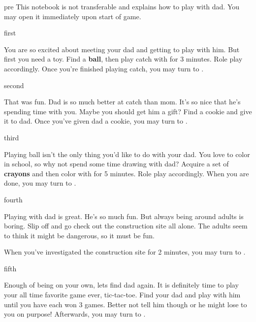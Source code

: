\documentclass[notebook]{guildcamp1}
\begin{document}
\startnotebook{\nPlayWithDad{}}

\begin{page}{pre}
This notebook is not transferable and explains how to play with dad. You may open it immediately upon start of game.
\end{page}

\begin{page}{first}

You are so excited about meeting your dad and getting to play with him. But first you need a toy. Find a {\bf ball}, then play catch with \cGroomA{} for 3 minutes. Role play accordingly.  Once you're finished playing catch, you may turn to .

\end{page}

\begin{page}{second}

That was fun. Dad is so much better at catch than mom. It's so nice that he's spending time with you. Maybe you should get him a gift? Find a cookie and give it to dad.  Once you've given dad a cookie, you may turn to .

\end{page}

\begin{page}{third}

Playing ball isn't the only thing you'd like to do with your dad.  You love to color in school, so why not spend some time drawing with dad?  Acquire a set of {\bf crayons} and then color with \cGroomA{} for 5 minutes. Role play accordingly. When you are done, you may turn to .

\end{page}

\begin{page}{fourth}

Playing with dad is great. He's so much fun. But always being around adults is boring. Slip off and go check out the construction site all alone. The adults seem to think it might be dangerous, so it must be fun.

When you've investigated the construction site for 2 minutes, you may turn to .

\end{page}

\begin{page}{fifth}

Enough of being on your own, lets find dad again. It is definitely time to play your all time favorite game ever, tic-tac-toe.  Find your dad and play with him until you have  each won 3 games.  Better not tell him though or he might lose to you on purpose! Afterwards, you may turn to .

\end{page}
\end{document}
